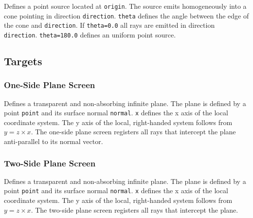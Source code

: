 \documentclass[10pt,a4paper,titlepage]{article}
\begin{document}





Defines a point source located at {\tt origin}. The source emits homogeneously into a cone pointing in direction {\tt direction}. {\tt theta} defines the angle between the edge of the cone and {\tt direction}. If {\tt theta=0.0} all rays are emitted in direction {\tt direction}. {\tt theta=180.0} defines an uniform point source.


\subsection{Targets}

\subsubsection{One-Side Plane Screen}






Defines a transparent and non-absorbing infinite plane. The plane is defined by a point {\tt point} and its surface normal {\tt normal}. {\tt x} defines the x axis of the local coordinate system. The y axis of the local, right-handed system follows from $y=z \times x$. The one-side plane screen registers all rays that intercept the plane anti-parallel to its normal vector.


\subsubsection{Two-Side Plane Screen}






Defines a transparent and non-absorbing infinite plane. The plane is defined by a point {\tt point} and its surface normal {\tt normal}. {\tt x} defines the x axis of the local coordinate system. The y axis of the local, right-handed system follows from $y=z \times x$. The two-side plane screen registers all rays that intercept the plane.
\end{document}
